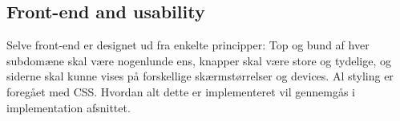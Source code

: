 \subsection{Front-end and usability}\label{sec:frontendArc}
Selve front-end er designet ud fra enkelte principper: Top og bund af hver subdomæne skal være nogenlunde ens, knapper skal være store og tydelige, og siderne skal kunne vises på forskellige skærmstørrelser og devices. Al styling er foregået med CSS. Hvordan alt dette er implementeret vil gennemgås i implementation afsnittet.
